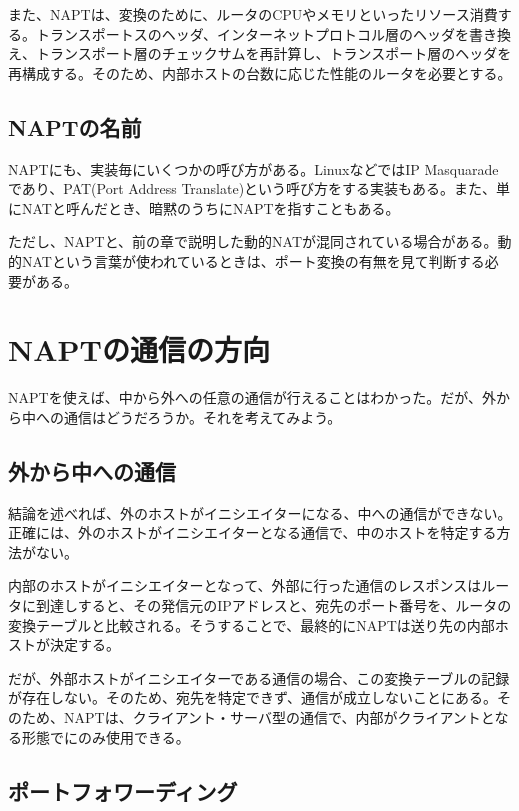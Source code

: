 また、NAPTは、変換のために、ルータのCPUやメモリといったリソース消費する。トランスポートスのヘッダ、インターネットプロトコル層のヘッダを書き換え、トランスポート層のチェックサムを再計算し、トランスポート層のヘッダを再構成する。そのため、内部ホストの台数に応じた性能のルータを必要とする。


\subsection{NAPTの名前}
NAPTにも、実装毎にいくつかの呼び方がある。LinuxなどではIP Masquaradeであり、PAT(Port Address Translate)という呼び方をする実装もある。また、単にNATと呼んだとき、暗黙のうちにNAPTを指すこともある。

ただし、NAPTと、前の章で説明した動的NATが混同されている場合がある。動的NATという言葉が使われているときは、ポート変換の有無を見て判断する必要がある。

\section{NAPTの通信の方向}

NAPTを使えば、中から外への任意の通信が行えることはわかった。だが、外から中への通信はどうだろうか。それを考えてみよう。

\subsection{外から中への通信}
結論を述べれば、外のホストがイニシエイターになる、中への通信ができない。正確には、外のホストがイニシエイターとなる通信で、中のホストを特定する方法がない。

内部のホストがイニシエイターとなって、外部に行った通信のレスポンスはルータに到達しすると、その発信元のIPアドレスと、宛先のポート番号を、ルータの変換テーブルと比較される。そうすることで、最終的にNAPTは送り先の内部ホストが決定する。

だが、外部ホストがイニシエイターである通信の場合、この変換テーブルの記録が存在しない。そのため、宛先を特定できず、通信が成立しないことにある。そのため、NAPTは、クライアント・サーバ型の通信で、内部がクライアントとなる形態でにのみ使用できる。

\subsection{ポートフォワーディング}

